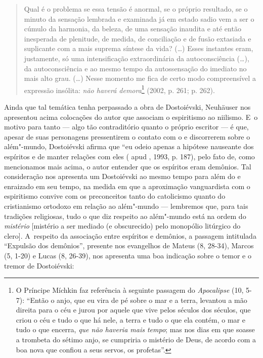 \begin{quote}
Qual é o problema se essa tensão é anormal, se o próprio resultado, se o
minuto da sensação lembrada e examinada já em estado sadio vem a ser o
cúmulo da harmonia, da beleza, de uma sensação inaudita e até então
inesperada de plenitude, de medida, de conciliação e de fusão extasiada
e suplicante com a mais suprema síntese da vida? (\ldots{}) Esses
instantes eram, justamente, só uma intensificação extraordinária da
autoconsciência (\ldots), da autoconsciência e ao mesmo tempo da
autossensação do imediato no mais alto grau. (\ldots{}) Nesse momento me
fica de certo modo compreensível a expressão insólita: \emph{não haverá
demora}\footnote{O Príncipe Míchkin faz referência à seguinte passagem
  do \emph{Apocalipse} (10, 5-7): ``Então o anjo, que eu vira de pé
  sobre o mar e a terra, levantou a mão direita para o céu e jurou por
  aquele que vive pelos séculos dos séculos, que criou o céu e tudo o
  que há nele, a terra e tudo o que ela contém, o mar e tudo o que
  encerra, \emph{que não haveria mais tempo}; mas nos dias em que soasse
  a trombeta do sétimo anjo, se cumpriria o mistério de Deus, de acordo
  com a boa nova que confiou a seus servos, os profetas''.} (2002, p.
261; p. 262).
\end{quote}

Ainda que tal temática tenha perpassado a obra de Dostoiévski, Neuhäuser
nos apresentou acima colocações do autor que associam o espiritismo ao
niilismo. E~o motivo para tanto --- algo tão contraditório quanto o
próprio escritor --- é que, apesar de suas personagens pressentirem o
contato com o e discorrerem sobre o além"-mundo, Dostoiévski afirma que
``eu odeio apenas a hipótese nauseante dos espíritos e de manter
relações com eles ( apud , 1993, p. 187), pelo fato
de, como mencionamos mais acima, o autor entender que os espíritos eram
demônios. Tal consideração nos apresenta um Dostoiévski ao mesmo tempo
para além do e enraizado em seu tempo, na medida em que a aproximação
vanguardista com o espiritismo convive com os preconceitos tanto do
catolicismo quanto do cristianismo ortodoxo em relação ao além"-mundo ---
lembremos que, para tais tradições religiosas, tudo o que diz respeito
ao além"-mundo está na ordem do \emph{mistério} {[}mistério a ser mediado
(e obscurecido) pelo monopólio litúrgico do clero{]}. A~respeito da
associação entre espíritos e demônios, a passagem intitulada ``Expulsão
dos demônios'', presente nos evangelhos de Mateus (8, 28-34), Marcos (5,
1-20) e Lucas (8, 26-39), nos apresenta uma boa indicação sobre o temor
e o tremor de Dostoiévski:

